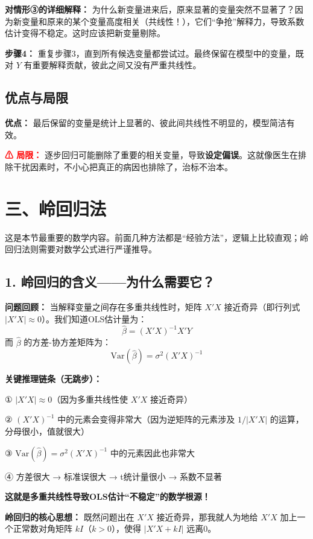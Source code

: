 \documentclass[12pt,a4paper]{ctexart}
\begin{document}
\textbf{对情形③的详细解释：} 为什么新变量进来后，原来显著的变量突然不显著了？因为新变量和原来的某个变量高度相关（共线性！），它们“争抢”解释力，导致系数估计变得不稳定。这时应该把新变量剔除。

\textbf{步骤4：} 重复步骤3，直到所有候选变量都尝试过。最终保留在模型中的变量，既对 $Y$ 有重要解释贡献，彼此之间又没有严重共线性。

\subsection{优点与局限}

\textbf{优点：} 最后保留的变量是统计上显著的、彼此间共线性不明显的，模型简洁有效。

\textcolor{red}{\textbf{⚠ 局限：}} 逐步回归可能删除了重要的相关变量，导致\textbf{设定偏误}。这就像医生在排除干扰因素时，不小心把真正的病因也排除了，治标不治本。

\section{三、岭回归法}

这是本节最重要的数学内容。前面几种方法都是“经验方法”，逻辑上比较直观；岭回归法则需要对数学公式进行严谨推导。

\subsection{1. 岭回归的含义——为什么需要它？}

\textbf{问题回顾：} 当解释变量之间存在多重共线性时，矩阵 $X'X$ 接近奇异（即行列式 $|X'X| \approx 0$）。我们知道OLS估计量为：
\[
\hat{\beta} = (X'X)^{-1}X'Y
\]
而 $\hat{\beta}$ 的方差-协方差矩阵为：
\[
\text{Var}(\hat{\beta}) = \sigma^2(X'X)^{-1}
\]

\textbf{关键推理链条（无跳步）：}

① $|X'X| \approx 0$（因为多重共线性使 $X'X$ 接近奇异）

② $(X'X)^{-1}$ 中的元素会变得非常大（因为逆矩阵的元素涉及 $1/|X'X|$ 的运算，分母很小，值就很大）

③ $\text{Var}(\hat{\beta}) = \sigma^2(X'X)^{-1}$ 中的元素因此也非常大

④ 方差很大 → 标准误很大 → t统计量很小 → 系数不显著

\textbf{这就是多重共线性导致OLS估计“不稳定”的数学根源！}

\textbf{岭回归的核心思想：} 既然问题出在 $X'X$ 接近奇异，那我就人为地给 $X'X$ 加上一个正常数对角矩阵 $kI$（$k > 0$），使得 $|X'X + kI|$ 远离0。
\end{document}
